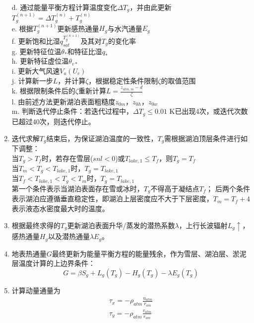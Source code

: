 \begin{enumerate}
    d. 通过能量平衡方程计算温度变化$\Delta T_g$，并由此更新$T_g^{\left(n+1\right)}=\Delta T_g^{\left(n\right)}+T_g^{\left(n\right)}$ \\
    e. 根据$T_g^{\left(n+1\right)}$更新感热通量$H_g$与水汽通量$E_g$ \\
    f. 更新饱和比湿$q_{sat}^{T_g^{\left(n+1\right)}}$及其对$T_g$的变化率 \\
    g. 更新特征位温$\theta_\ast$和特征比湿$q_\ast$ \\
    h. 更新特征虚位温$\theta_{v\ast}$ \\
    i. 更新大气风速$V_a\left(U_c\right)$ \\
    j. 计算新一步$L$，并计算$\zeta$，根据稳定性条件限制$\zeta$的取值范围 \\
    k. 根据限制条件后的$\zeta$重新计算$L=\frac{z_{atm,m}-d}{\zeta}$ \\
    l. 由前述方法更新湖泊表面粗糙度$z_{0m}$，$z_{0h}$，$z_{0w}$\\
    m. 判断迭代停止条件：若迭代过程中，$\Delta T_g\leqslant 0.01$ K已出现4次，或迭代次数已超过40次，则迭代停止。
    \item 迭代求解$T_g$结束后，为保证湖泊温度的一致性，$T_g$需根据湖泊顶层条件进行如下调整：\\
    当$T_g>T_f$时，若存在雪层($snl<0$)或$T_{lake,1}\leqslant T_f$，则$T_g=T_f$ \\
    当$T_m<T_g<T_{lake,1}$时，$T_g=T_{lake,1}$ \\
    当$T_f<T_{lake,1}<T_g<T_m$时，$T_g=T_{lake,1}$ \\
    第一个条件表示当湖泊表面存在雪或冰时，$T_g$不得高于凝结点$T_f$；
    后两个条件表示湖泊应遵循垂直稳定性，即湖泊上层密度应不大于下层密度，$T_m=T_f+4$表示液态水密度最大时的温度。
    \item 根据最终求得的$T_g$更新湖泊表面升华/蒸发的潜热系数$\lambda$，上行长波辐射$L_g\uparrow$，
    感热通量$H_g$以及潜热通量$\lambda E_g$。
    \item 地表热通量$G$最终更新为能量平衡方程的能量残余，作为雪层、湖泊层、淤泥层温度计算的上边界条件：
    \begin{equation}
    G=\beta S_{g}+L_{g}\left(T_{g}\right)-H_{g}\left(T_{g}\right)-\lambda E_{g}\left(T_{g}\right)
    \end{equation}
    \item 计算动量通量为
    \begin{equation}
    \begin{array}{c}\tau_{x}=-\rho_{atm} \frac{u_{atm}}{r_{am}} \\ \tau_{y}=-\rho_{atm} \frac{v_{atm}}{r_{am}}\end{array}

\end{equation}
\end{enumerate}
